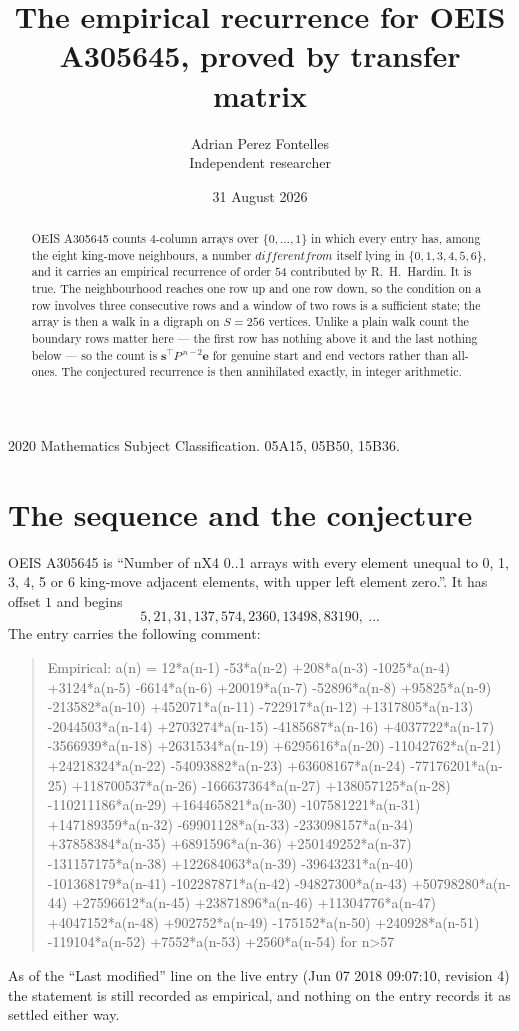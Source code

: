 \documentclass[11pt,a4paper]{article}
\title{The empirical recurrence for OEIS A305645, proved by transfer matrix}
\author{Adrian Perez Fontelles\\ \small Independent researcher}
\date{31 August 2026}
\theoremstyle{plain}
\theoremstyle{definition}
\begin{document}
\maketitle

\begin{abstract}
OEIS A305645 counts $4$-column arrays over $\{0,\dots,1\}$ in which every entry has,
among the eight king-move neighbours, a number $different from$ itself lying in $\{0,1,3,4,5,6\}$, and it carries an empirical
recurrence of order $54$ contributed by R.~H.~Hardin. It is true. The neighbourhood
reaches one row up and one row down, so the condition on a row involves three consecutive
rows and a window of two rows is a sufficient state; the array is then a walk in a digraph
on $S=256$ vertices. Unlike a plain walk count the boundary rows matter here --- the first
row has nothing above it and the last nothing below --- so the count is
$\mathbf{s}^{\!\top}P^{\,n-2}\mathbf{e}$ for genuine start and end vectors rather than
all-ones. The conjectured recurrence is then annihilated exactly, in integer arithmetic.
\end{abstract}

\noindent\small 2020 Mathematics Subject Classification. 05A15, 05B50, 15B36.\normalsize

\section{The sequence and the conjecture}

OEIS A305645 is ``Number of nX4 0..1 arrays with every element unequal to 0, 1, 3, 4, 5 or 6 king-move adjacent elements, with upper left element zero.''. It has offset
$1$ and begins
\[
5, 21, 31, 137, 574, 2360, 13498, 83190,\ \dots
\]
The entry carries the following comment:
\begin{quote}\small
Empirical: a(n) = 12*a(n-1) -53*a(n-2) +208*a(n-3) -1025*a(n-4) +3124*a(n-5) -6614*a(n-6) +20019*a(n-7) -52896*a(n-8) +95825*a(n-9) -213582*a(n-10) +452071*a(n-11) -722917*a(n-12) +1317805*a(n-13) -2044503*a(n-14) +2703274*a(n-15) -4185687*a(n-16) +4037722*a(n-17) -3566939*a(n-18) +2631534*a(n-19) +6295616*a(n-20) -11042762*a(n-21) +24218324*a(n-22) -54093882*a(n-23) +63608167*a(n-24) -77176201*a(n-25) +118700537*a(n-26) -166637364*a(n-27) +138057125*a(n-28) -110211186*a(n-29) +164465821*a(n-30) -107581221*a(n-31) +147189359*a(n-32) -69901128*a(n-33) -233098157*a(n-34) +37858384*a(n-35) +6891596*a(n-36) +250149252*a(n-37) -131157175*a(n-38) +122684063*a(n-39) -39643231*a(n-40) -101368179*a(n-41) -102287871*a(n-42) -94827300*a(n-43) +50798280*a(n-44) +27596612*a(n-45) +23871896*a(n-46) +11304776*a(n-47) +4047152*a(n-48) +902752*a(n-49) -175152*a(n-50) +240928*a(n-51) -119104*a(n-52) +7552*a(n-53) +2560*a(n-54) for n>57
\end{quote}
As of the ``Last modified'' line on the live entry (Jun 07 2018 09:07:10, revision
4) the statement is still recorded as empirical, and nothing on the entry
records it as settled either way.
\end{document}
